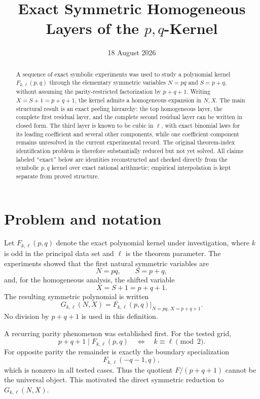 \documentclass[11pt]{article}
\title{\textbf{Exact Symmetric Homogeneous Layers of the \(p,q\)-Kernel}}\author{}
\date{18 August 2026}
\theoremstyle{remark}
\begin{document}
\maketitle

\begin{abstract}
A sequence of exact symbolic experiments was used to study a polynomial kernel
\(F_{k,\ell}(p,q)\) through the elementary symmetric variables
\(N=pq\) and \(S=p+q\), without assuming the parity-restricted factorization by
\(p+q+1\).  Writing
\(X=S+1=p+q+1\), the kernel admits a homogeneous expansion in \(N,X\).
The main structural result is an exact peeling hierarchy: the top homogeneous layer,
the complete first residual layer, and the complete second residual layer can be written
in closed form.  The third layer is known to be cubic in \(\ell\), with exact binomial laws
for its leading coefficient and several other components, while one coefficient component
remains unresolved in the current experimental record.  The original theorem-index
identification problem is therefore substantially reduced but not yet solved.
All claims labeled ``exact'' below are identities reconstructed and checked directly from
the symbolic \(p,q\) kernel over exact rational arithmetic; empirical interpolation is kept
separate from proved structure.
\end{abstract}

\section{Problem and notation}

Let \(F_{k,\ell}(p,q)\) denote the exact polynomial kernel under investigation, where
\(k\) is odd in the principal data set and \(\ell\) is the theorem parameter.  The
experiments showed that the first natural symmetric variables are
\[
    N=pq,\qquad S=p+q,
\]
and, for the homogeneous analysis, the shifted variable
\[
    X=S+1=p+q+1.
\]
The resulting symmetric polynomial is written
\[
    G_{k,\ell}(N,X)
    =F_{k,\ell}(p,q)\big|_{N=pq,\,X=p+q+1}.
\]
No division by \(p+q+1\) is used in this definition.

A recurring parity phenomenon was established first.  For the tested grid,
\[
 p+q+1 \mid F_{k,\ell}(p,q)
\quad\Longleftrightarrow\quad
 k\equiv \ell\pmod 2.
\]
For opposite parity the remainder is exactly the boundary specialization
\[
 F_{k,\ell}(-q-1,q),
\]
which is nonzero in all tested cases.  Thus the quotient
\(F/(p+q+1)\) cannot be the universal object.  This motivated the direct symmetric
reduction to \(G_{k,\ell}(N,X)\).
\end{document}
